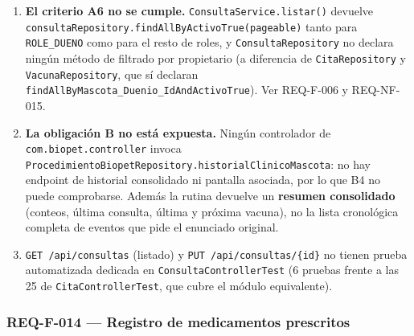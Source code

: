 \documentclass[
  spanish,
]{article}
\providecommand{\tightlist}{%
  \setlength{\itemsep}{0pt}\setlength{\parskip}{0pt}}
\begin{document}
\begin{itemize}
  \begin{enumerate}
  \def\labelenumi{(\alph{enumi})}
  \tightlist
  \item
    \textbf{El criterio A6 no se cumple.}
    \texttt{Consulta\allowbreak{}Service.\allowbreak{}listar()} devuelve
    \texttt{consulta\allowbreak{}Repository.\allowbreak{}find\allowbreak{}All\allowbreak{}By\allowbreak{}Activo\allowbreak{}True(pageable)} tanto para
    \texttt{ROLE\_\allowbreak{}DUENO} como para el resto de roles, y
    \texttt{Consulta\allowbreak{}Repository} no declara ningún método de filtrado por
    propietario (a diferencia de \texttt{Cita\allowbreak{}Repository} y
    \texttt{Vacuna\allowbreak{}Repository}, que sí declaran
    \texttt{find\allowbreak{}All\allowbreak{}By\allowbreak{}Mascota\_\allowbreak{}Duenio\_\allowbreak{}Id\allowbreak{}And\allowbreak{}Activo\allowbreak{}True}). Ver REQ-F-006 y
    REQ-NF-015.
  \item
    \textbf{La obligación B no está expuesta.} Ningún controlador de
    \texttt{com.\allowbreak{}biopet.\allowbreak{}controller} invoca
    \texttt{Procedimiento\allowbreak{}Biopet\allowbreak{}Repository.\allowbreak{}historial\allowbreak{}Clinico\allowbreak{}Mascota}: no
    hay endpoint de historial consolidado ni pantalla asociada, por lo
    que B4 no puede comprobarse. Además la rutina devuelve un
    \textbf{resumen consolidado} (conteos, última consulta, última y
    próxima vacuna), no la lista cronológica completa de eventos que
    pide el enunciado original.
  \item
    \texttt{GET\ /\allowbreak{}api/\allowbreak{}consultas} (listado) y
    \texttt{PUT\ /\allowbreak{}api/\allowbreak{}consultas/\allowbreak{}\{id\}} no tienen prueba automatizada
    dedicada en \texttt{Consulta\allowbreak{}Controller\allowbreak{}Test} (6 pruebas frente a las
    25 de \texttt{Cita\allowbreak{}Controller\allowbreak{}Test}, que cubre el módulo equivalente).
  \end{enumerate}
\end{itemize}

\subsubsection{REQ-F-014 --- Registro de medicamentos
prescritos}\label{req-f-014-registro-de-medicamentos-prescritos}
\end{document}
